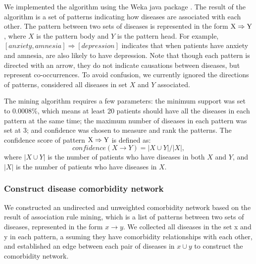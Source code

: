 We implemented the algorithm using the Weka java package \cite{hall2009weka}.
The result of the algorithm is a set of patterns indicating how diseases are associated with each other.
The pattern between two sets of diseases is
represented in the form ${\rm{X}} \Rightarrow {\rm{Y}}$,
where $X$ is the pattern body and $Y$ is the pattern head.
For example, $[anxiety, amnesia] \Rightarrow [depression]$
indicates that when patients have anxiety and amnesia,
are also likely to have depression.
Note that though each pattern is directed with an arrow,
they do not indicate causations between diseases,
but represent co-occurrences. To avoid confusion,
we currently ignored the directions of patterns,
 considered all diseases in set $X$ and $Y$ associated.

The mining algorithm requires a few parameters:
the minimum support was set to 0.0008\%, which means
at least 20 patients should have all the diseases
in each pattern at the same time; the maximum
number of diseases in each pattern was set at 3;
and confidence was chosen to measure and rank the patterns.
The confidence score of pattern ${\rm{X}} \Rightarrow {\rm{Y}}$ is defined as:
\begin{equation}
confidence(X \to Y) = |X \cup Y|/|X|\label{arm},
\end{equation}
where $|X \cup Y|$ is the number of patients who have diseases
in both $X$ and $Y$, and $|X|$ is the number of patients who have diseases in $X$.

\subsubsection{Construct disease comorbidity network }
We constructed an undirected and unweighted comorbidity network
based on the result of association rule mining,
which is a list of patterns between two sets of diseases,
represented in the form $x \to y$.
We collected all diseases in the set x and y in each pattern, a
ssuming they have comorbidity relationships with each other,
and established an edge between each pair of diseases in $x \cup y$ to construct the comorbidity network.

